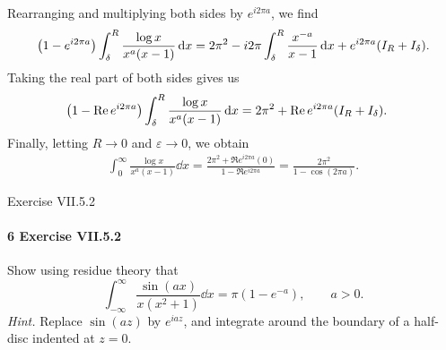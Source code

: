 \documentclass[12pt]{article}
\newenvironment{fullbox}{\begin{lrbox}{\savefullbox}\begin{minipage}{\dimexpr\textwidth-2\fboxsep\relax}}{\end{minipage}\end{lrbox}\begin{center}\framebox[\textwidth]{\usebox{\savefullbox}}\end{center}}
\newenvironment{pbox}[1][]{\begin{fullbox}\ifx#1\empty\else\paragraph{#1}\fi}{\end{fullbox}}
\theoremstyle{definition}
\newcommand{\eps}{\varepsilon}
\begin{document}
Rearranging and multiplying both sides by $e^{i2\pi a}$, we find
\[
    \qty(1 - e^{i2\pi a})\int_{\delta}^{R} \frac{\log x}{x^a(x-1)} \dd{x}
        = 2\pi^2 - i2\pi \int_{\delta}^{R} \frac{x^{-a}}{x - 1} \dd{x} + e^{i2\pi a}(I_R + I_\delta).
\]
Taking the real part of both sides gives us
\begin{align*}
    \qty(1 - \Re e^{i2\pi a})\int_{\delta}^{R} \frac{\log x}{x^a(x-1)} \dd{x}
        &= 2\pi^2 + \Re e^{i2\pi a}(I_R + I_\delta).
\end{align*}
Finally, letting $R \to 0$ and $\eps \to 0$, we obtain
\begin{align*}
    \int_{0}^{\infty} \frac{\log x}{x^a(x-1)} \dd{x}
        = \frac{2\pi^2 + \Re e^{i2\pi a}(0)}{1 - \Re e^{i2\pi a}}
        = \frac{2\pi^2}{1 - \cos(2\pi a)}.
\end{align*}





\newpage
\begin{pbox}[6 Exercise VII.5.2]
    Show using residue theory that
    \[
        \int_{-\infty}^{\infty} \frac{\sin(ax)}{x(x^2 + 1)} \dd{x} = \pi(1 - e^{-a}), \qquad a > 0.
    \]
    \textit{Hint.} Replace $\sin(az)$ by $e^{iaz}$, and integrate around the boundary of a half-disc indented at $z = 0$.
\end{pbox}
\end{document}
